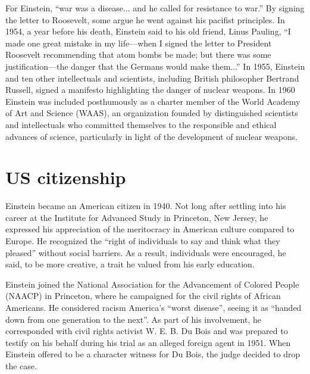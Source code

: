 \documentclass[twoside]{memoir}
\begin{document}
For Einstein, \enquote{war was a disease... and he called for resistance to war.} By signing the letter to  Roosevelt, some argue he went against his pacifist principles.\cite{z73PK} In 1954, a year before his death, Einstein said to his old friend, Linus Pauling, \enquote{I made one great mistake in my life---when I signed the letter to President Roosevelt recommending that atom bombs be made; but there was some justification---the danger that the Germans would make them...} In 1955, Einstein and ten other intellectuals and scientists, including British philosopher Bertrand Russell, signed a manifesto highlighting the danger of nuclear weapons. In 1960 Einstein was included posthumously as a charter member of the  World Academy of Art and Science (\acrshort{WAAS}), an organization founded by distinguished scientists and intellectuals who committed themselves to the responsible and ethical advances of science, particularly in light of the development of nuclear weapons.

\section{US citizenship}\label{us-citizenship}

Einstein became an American citizen in 1940.  Not long after settling into his career at the Institute for Advanced Study in Princeton, New Jersey, he expressed his appreciation of the meritocracy in American culture compared to Europe. He recognized the \enquote{right of individuals to say and think what they pleased} without social barriers. As a result, individuals were encouraged, he said, to be more creative, a trait he valued from his early education.

Einstein joined the National Association for the Advancement of Colored People (\acrshort{NAACP})  in Princeton, where he campaigned for the civil rights of African Americans. He considered racism America's \enquote{worst disease}, seeing it as \enquote{handed down from one generation to the next}. As part of his involvement, he corresponded with civil rights activist W. E. B. Du Bois and was prepared to testify on his behalf during his trial as an alleged foreign agent in 1951. When Einstein offered to be a character witness for Du Bois, the judge decided to drop the case.\cite{civil}
\end{document}
